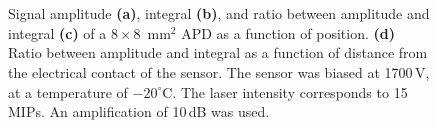 \documentclass{article}
\begin{document}
\begin{figure}
  \centering
  \hfill
  \\
  \hfill
  \\
  \caption{Signal amplitude {\bf (a)}, integral {\bf (b)}, and ratio between amplitude and integral {\bf (c)} of a $8 \times 8$~mm$^2$ APD as a function of position. {\bf (d)} Ratio between amplitude and integral as a function of distance from the electrical contact of the sensor. The sensor was biased at 1700\,V, at a temperature of $-20^\circ$C. The laser intensity corresponds to 15 MIPs. An amplification of 10\,dB was used.}
  \label{fig:8x8unif_noMetal}
\end{figure}
\end{document}
